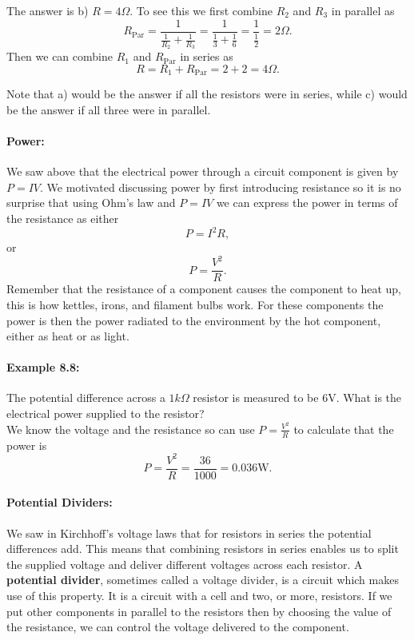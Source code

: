 \documentclass[a4paper,12pt]{book}
\begin{document}
The answer is b) $R=4\Omega$. To see this we first combine $R_{2}$ and $R_{3}$ in parallel as
\begin{equation*}
R_{\text{Par}}=\frac{1}{\frac{1}{R_{2}}+\frac{1}{R_{3}}}=\frac{1}{\frac{1}{3}+\frac{1}{6}}=\frac{1}{\frac{1}{2}}=2\Omega.
\end{equation*}
Then we can combine $R_{1}$ and $R_{\text{Par}}$ in series as
\begin{equation*}
R =R_{1}+R_{\text{Par}}=2+2=4\Omega.
\end{equation*}

Note that a) would be the answer if all the resistors were in series, while c) would be the answer if all three were in parallel.

\paragraph{Power:} We saw above that the electrical power through a circuit component is given by $P=IV$. We motivated discussing power by first introducing resistance so it is no surprise that using Ohm's law and $P=IV$ we can express the power in terms of the resistance as either
\begin{equation*}
P=I^{2}R,
\end{equation*}
or
\begin{equation*}
P=\frac{V^{2}}{R}.
\end{equation*}
Remember that the resistance of a component causes the component to heat up, this is how kettles, irons, and filament bulbs work. For these components the power is then the power radiated to the environment by the hot component, either as heat or as light.

\paragraph{Example 8.8:} The potential difference across a $1k\Omega$ resistor is measured to be $6\text{V}$. What is the electrical power supplied to the resistor?\\

We know the voltage and the resistance so can use $P=\frac{V^{2}}{R}$ to calculate that the power is
\begin{equation*}
P=\frac{V^{2}}{R}=\frac{36}{1000}=0.036\text{W}.
\end{equation*}


\paragraph{Potential Dividers:} We saw in Kirchhoff's voltage laws that for resistors in series the potential differences add. This means that combining resistors in series enables us to split the supplied voltage and deliver different voltages across each resistor. A \textbf{potential divider}, sometimes called a voltage divider, is a circuit which makes use of this property. It is a circuit with a cell and two, or more, resistors. If we put other components in parallel to the resistors then by choosing the value of the resistance, we can control the voltage delivered to the component.\\
\end{document}
